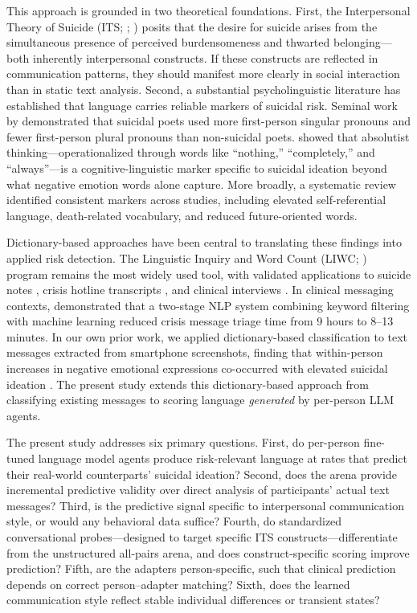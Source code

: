 \documentclass[review,12pt,authoryear]{elsarticle}
\begin{document}
This approach is grounded in two theoretical foundations. First, the Interpersonal Theory of Suicide (ITS; \citealt{joiner2005why}; \citealt{vanorden2010interpersonal}) posits that the desire for suicide arises from the simultaneous presence of perceived burdensomeness and thwarted belonging---both inherently interpersonal constructs. If these constructs are reflected in communication patterns, they should manifest more clearly in social interaction than in static text analysis. Second, a substantial psycholinguistic literature has established that language carries reliable markers of suicidal risk. Seminal work by \citet{stirman2001word} demonstrated that suicidal poets used more first-person singular pronouns and fewer first-person plural pronouns than non-suicidal poets. \citet{almosaiwi2018absolute} showed that absolutist thinking---operationalized through words like ``nothing,'' ``completely,'' and ``always''---is a cognitive-linguistic marker specific to suicidal ideation beyond what negative emotion words alone capture. More broadly, a systematic review \citep{ophir2022linguistic} identified consistent markers across studies, including elevated self-referential language, death-related vocabulary, and reduced future-oriented words.

Dictionary-based approaches have been central to translating these findings into applied risk detection. The Linguistic Inquiry and Word Count (LIWC; \citealt{pennebaker2015development}) program remains the most widely used tool, with validated applications to suicide notes \citep{pestian2012sentiment}, crisis hotline transcripts \citep{huang2024mindsets}, and clinical interviews \citep{tausczik2010psychological}. In clinical messaging contexts, \citet{swaminathan2023nlp} demonstrated that a two-stage NLP system combining keyword filtering with machine learning reduced crisis message triage time from 9 hours to 8--13 minutes. In our own prior work, we applied dictionary-based classification to text messages extracted from smartphone screenshots, finding that within-person increases in negative emotional expressions co-occurred with elevated suicidal ideation \citep{ammerman2026beyond}. The present study extends this dictionary-based approach from classifying existing messages to scoring language \textit{generated} by per-person LLM agents.

The present study addresses six primary questions. First, do per-person fine-tuned language model agents produce risk-relevant language at rates that predict their real-world counterparts' suicidal ideation? Second, does the arena provide incremental predictive validity over direct analysis of participants' actual text messages? Third, is the predictive signal specific to interpersonal communication style, or would any behavioral data suffice? Fourth, do standardized conversational probes---designed to target specific ITS constructs---differentiate from the unstructured all-pairs arena, and does construct-specific scoring improve prediction? Fifth, are the adapters person-specific, such that clinical prediction depends on correct person--adapter matching? Sixth, does the learned communication style reflect stable individual differences or transient states?
\end{document}
